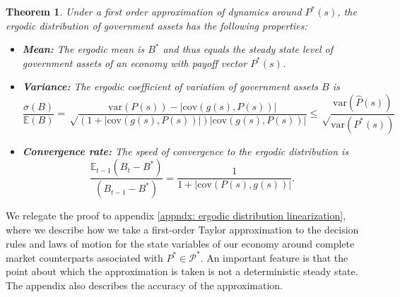 \documentclass[thmsb,11pt]{article}
\newtheorem{theorem}{Theorem}
\newcommand{\EE}{\mathbb E}
\newcommand{\var}{\mathrm{var}}
\newcommand{\cov}{\mathrm{cov}}
\begin{document}
\begin{theorem}
\label{thm: rep agent linear policies}
Under a  first order approximation of dynamics around $P^*(s)$, the ergodic distribution of government assets has the following properties:
\begin{itemize}
 \item \textbf{Mean:} The ergodic mean is $B^*$ and thus equals the steady state level of government assets  of an economy with payoff vector $P^*(s)$.
 \item \textbf{Variance:} The ergodic coefficient of variation of government assets $B$ is
  \[
    \frac{\sigma(B)}{\mathbb E(B)} = \sqrt\frac{\var(P(s)) - |\cov(g(s),P(s))|}{(1+|\cov(g(s),P(s))|)|\cov(g(s),P(s))|}\leq\sqrt\frac{\var(\hat{P}(s))}{\var(P^*(s))}
  \]
  \item \textbf{Convergence rate:} The speed of convergence to the ergodic distribution is
  \[
    \frac{\EE_{t-1}(B_t-B^*)}{(B_{t-1} - B^*)} = \frac1{1+|\cov(P(s),g(s))|}.
  \]

\end{itemize}


\end{theorem}
 We relegate the proof to appendix  \ref{appndx: ergodic distribution linearization}, where we describe how %
we take a first-order Taylor approximation to the decision rules and laws of motion for the state variables of our
economy around complete market counterparts associated with $P^*\in \mathcal{P}^*$.
An important feature is that the point about which the  approximation is taken is not a deterministic steady state.
The appendix also describes the accuracy of the approximation.
\end{document}
